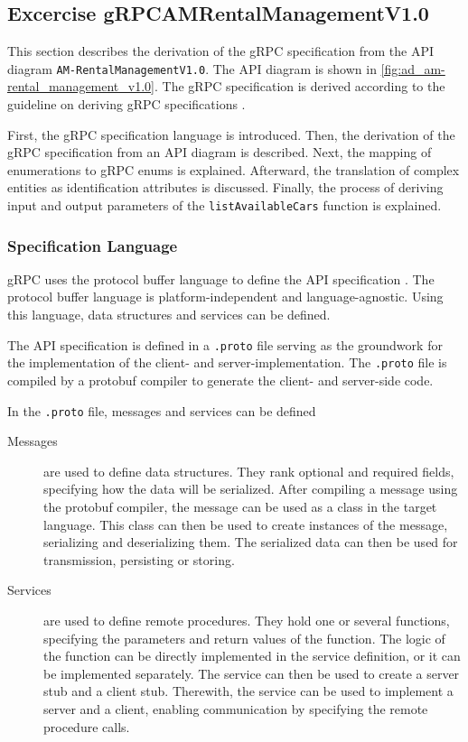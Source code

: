 \subsection{Excercise gRPCAMRentalManagementV1.0}
This section describes the derivation of the gRPC specification from the API diagram \texttt{AM-RentalManagementV1.0}.
The API diagram is shown in \autoref{fig:ad_am-rental_management_v1.0}.
The gRPC specification is derived according to the guideline on deriving gRPC specifications \cite{CM-G-RPC}.

First, the gRPC specification language is introduced.
Then, the derivation of the gRPC specification from an API diagram is described.
Next, the mapping of enumerations to gRPC enums is explained.
Afterward, the translation of complex entities as identification attributes is discussed.
Finally, the process of deriving input and output parameters of the \texttt{listAvailableCars} function is explained.

\subsubsection*{Specification Language}
gRPC uses the protocol buffer language to define the API specification \cite{PRO-DOC}.
The protocol buffer language is platform-independent and language-agnostic.
Using this language, data structures and services can be defined.

The API specification is defined in a \texttt{.proto} file serving as the groundwork for the implementation of the client- and server-implementation.
The \texttt{.proto} file is compiled by a protobuf compiler to generate the client- and server-side code.

In the \texttt{.proto} file, messages and services can be defined
\begin{description}
    \item[Messages] are used to define data structures.
    They rank optional and required fields, specifying how the data will be serialized.
    After compiling a message using the protobuf compiler, the message can be used as a class in the target language.
    This class can then be used to create instances of the message, serializing and deserializing them.
    The serialized data can then be used for transmission, persisting or storing. 
    \item[Services] are used to define remote procedures.
    They hold one or several functions, specifying the parameters and return values of the function.
    The logic of the function can be directly implemented in the service definition, or it can be implemented separately.
    The service can then be used to create a server stub and a client stub.
    Therewith, the service can be used to implement a server and a client, enabling communication by specifying the remote procedure calls.
\end{description}

